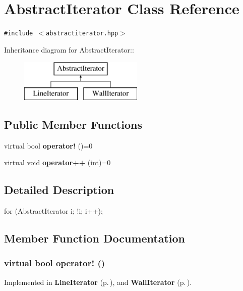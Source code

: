 \section{Abstract\-Iterator Class Reference}
\label{classAbstractIterator}
{\tt \#include $<$abstractiterator.hpp$>$}

Inheritance diagram for Abstract\-Iterator::\begin{figure}[H]
\begin{center}
\leavevmode
\includegraphics[height=2cm]{classAbstractIterator}
\end{center}
\end{figure}
\subsection*{Public Member Functions}
\begin{CompactItemize}
\item 
virtual bool {\bf operator!} ()=0
\item 
virtual void {\bf operator++} (int)=0
\end{CompactItemize}


\subsection{Detailed Description}
for (Abstract\-Iterator i; !i; i++);



\subsection{Member Function Documentation}
\subsubsection{\setlength{\rightskip}{0pt plus 5cm}virtual bool operator! ()\hspace{0.3cm}{\tt  [pure virtual]}}\label{classAbstractIterator_a0}




Implemented in {\bf Line\-Iterator} {\rm (p.\,\pageref{classLineIterator_a1})}, and {\bf Wall\-Iterator} {\rm (p.\,\pageref{classWallIterator_a1})}.
